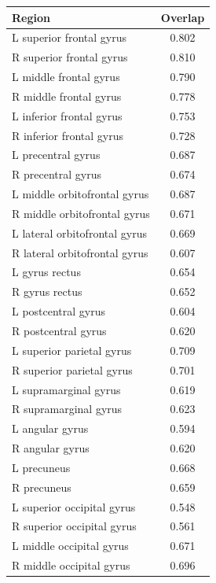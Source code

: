 \documentclass{llncs}
\begin{document}
\begin{table}[ht]
\begin{minipage}[b]{0.5\linewidth}\centering
\begin{tabular}{lc}
{\bf Region} & {\bf Overlap} \\
\hline
L superior frontal gyrus & 0.802 \\
R superior frontal gyrus & 0.810 \\
L middle frontal gyrus & 0.790 \\
R middle frontal gyrus & 0.778 \\
L inferior frontal gyrus & 0.753 \\
R inferior frontal gyrus & 0.728 \\
L precentral gyrus & 0.687 \\
R precentral gyrus & 0.674 \\
L middle orbitofrontal gyrus & 0.687 \\
R middle orbitofrontal gyrus & 0.671 \\
L lateral orbitofrontal gyrus & 0.669 \\
R lateral orbitofrontal gyrus & 0.607 \\
L gyrus rectus & 0.654 \\
R gyrus rectus & 0.652 \\
L postcentral gyrus & 0.604 \\
R postcentral gyrus & 0.620 \\
L superior parietal gyrus & 0.709 \\
R superior parietal gyrus & 0.701 \\
L supramarginal gyrus & 0.619 \\
R supramarginal gyrus & 0.623 \\
L angular gyrus & 0.594 \\
R angular gyrus & 0.620 \\
L precuneus & 0.668 \\
R precuneus & 0.659 \\
L superior occipital gyrus & 0.548 \\
R superior occipital gyrus & 0.561 \\
L middle occipital gyrus & 0.671 \\
R middle occipital gyrus & 0.696 \\
\hline
\end{tabular}
\end{minipage}
\begin{minipage}[b]{0.5\linewidth}
\centering
\begin{tabular}{lc}

\end{tabular}
\end{minipage}
\end{table}
\end{document}
